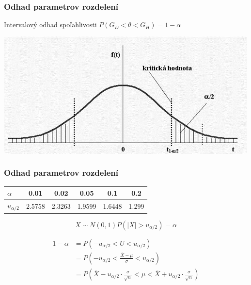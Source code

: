 \documentclass{beamer}
\begin{document}
\begin{frame}
\frametitle{Odhad parametrov rozdelení}

\begin{block}{Intervalový odhad spoľahlivosti}
$P (G_D < \theta < G_H) = 1 - \alpha$
\end{block}

\includegraphics[width=\textwidth]{df4.png}
\end{frame}


\begin{frame}
\frametitle{Odhad parametrov rozdelení}

\begin{table}[t]
\begin{tabular}{|l|c|c|c|c|c|}
\hline
$\alpha$     & 0.01   & 0.02   & 0.05   & 0.1    & 0.2   \\ \hline
$u_{\alpha/2}$ & 2.5758 & 2.3263 & 1.9599 & 1.6448 & 1.299 \\ \hline
\end{tabular}
\end{table}
\begin{equation*}
X \sim N(0,1) P(|X| > u_{\alpha/2}) = \alpha
\end{equation*}

\begin{align*}
1 - \alpha &= P(-u_{\alpha/2} < U < u_{\alpha/2}) \\
               &= P(-u_{\alpha/2} < \frac{\overline{X}-\mu}{\sigma} < u_{\alpha/2}) \\
               &= P(\overline{X} - u_{\alpha/2} \cdot \frac{\sigma}{\sqrt{n}} < \mu < \overline{X} + u_{\alpha/2} \cdot \frac{\sigma}{\sqrt{n}})
\end{align*}

\end{frame}
\end{document}
